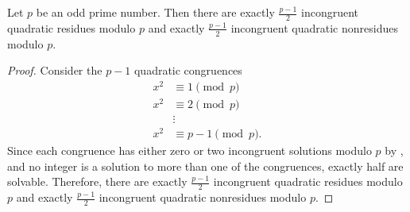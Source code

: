 \documentclass{ximera}
\begin{document}
\begin{proposition}[Proposition 4.3]\label{prop:number-quad-residues}
	Let $p$ be an odd prime number. Then there are exactly $\frac{p-1}{2}$ incongruent quadratic residues modulo $p$ and exactly $\frac{p-1}{2}$ incongruent quadratic nonresidues modulo $p.$
\end{proposition}
\begin{proof}
	Consider the $p-1$ quadratic congruences
	\begin{align*}
 		x^2&\equiv 1\pmod{p}\\
		x^2&\equiv 2\pmod{p}\\
		&\vdots\\
		x^2&\equiv p-1\pmod{p}.
	\end{align*}
	Since each congruence has either zero or two incongruent solutions modulo $p$ by , and no integer is a solution to more than one of the congruences, exactly half are solvable. Therefore,  there are exactly $\frac{p-1}{2}$ incongruent quadratic residues modulo $p$ and exactly $\frac{p-1}{2}$ incongruent quadratic nonresidues modulo $p.$
\end{proof}

\end{document}
